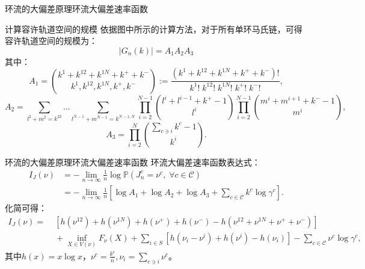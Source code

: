 \documentclass{beamer}
\begin{document}
\begin{frame}{环流的大偏差原理}{环流大偏差速率函数}
	\begin{block}{计算容许轨道空间的规模}
		依据图中所示的计算方法，对于所有单环马氏链，可得容许轨道空间的规模为：
		$$|G_n(k)|=A_1A_2A_3 $$
		其中：{\footnotesize
		\begin{equation*}\label{formula:A1}
			A_1 = \binom{k^1+k^{12}+k^{1N}+k^{+}+k^{-}}{k^1,k^{12},k^{1N},k^{+},k^{-}}
			:= \frac{(k^1+k^{12}+k^{1N}+k^{+}+k^{-})!}{k^1!\;k^{12}!\;k^{1N}!\;k^{+}!\;k^{-}!},
		\end{equation*}
		\begin{equation*}
			A_2 = \sum_{l^{2}+m^{2}=k^{23}}\dots\sum_{l^{N-1}+m^{N-1}=k^{N-1,N}}
			\prod_{i=2}^{N-1}\binom{l^{i}+l^{i-1}+k^{+}-1}{l^{i}}\prod_{i=2}^{N-1}\binom{m^{i}+m^{i+1}+k^{-}-1}{m^{i}},
		\end{equation*}
		\begin{equation*}\label{formula:A3}
			A_3 = \prod_{i=2}^N\binom{\sum_{c\ni i}k^{c}-1}{k^{i}}.
		\end{equation*}}
	\end{block}
\end{frame}

\begin{frame}{环流的大偏差原理}{环流大偏差速率函数}
	环流大偏差速率函数表达式：
	\begin{equation*}
		\begin{split}
			I_J(\nu) &= -\lim_{n\to\infty}\frac{1}{n}\log\mathbb{P}\left(J^c_n=\nu^c,\;\forall c\in\mathcal{C}\right)\\
			&= -\lim_{n\to\infty}\frac{1}{n}\left[\log A_1+\log A_2+\log A_3+\sum_{c\in\mathcal{C}}k^c\log\gamma^c\right].
		\end{split}
	\end{equation*}
	化简可得：
	\begin{equation*}\label{ratefunction}
		\begin{split}
			I_J(\nu) =&\; \left[h\left(\nu^{12}\right)+h\left(\nu^{1N}\right)
				+h\left(\nu^+\right)+h\left(\nu^-\right)-h\left(\nu^{12}+\nu^{1N}+\nu^++\nu^-\right)\right] \\
			&\;+\inf_{X\in V(\nu)}F_{\nu}(X)+\sum_{i\in S}\left[ h\left(\nu_i-\nu^i\right)+h\left(\nu^i\right)
				-h\left(\nu_i\right)\right]-\sum_{c\in\mathcal{C}}\nu^c\log\gamma^c,
		\end{split}
	\end{equation*}
	其中$h(x) = x \log x$，$\nu^c = \frac{k^c}{n}, \nu_i=\sum_{c\ni i}\nu^c$。
\end{frame}
\end{document}
